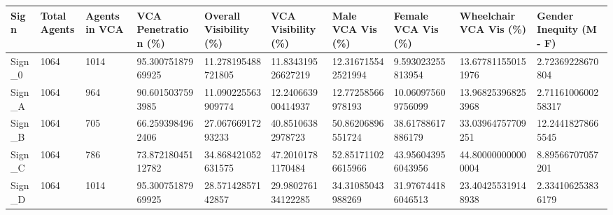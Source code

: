 \begin{tabular}{llllllllll}
\hline
Sign & Total Agents & Agents in VCA & VCA Penetration (\%) & Overall Visibility (\%) & VCA Visibility (\%) & Male VCA Vis (\%) & Female VCA Vis (\%) & Wheelchair VCA Vis (\%) & Gender Inequity (M - F) \\ \hline
Sign\_0 & 1064 & 1014 & 95.30075187969925 & 11.278195488721805 & 11.834319526627219 & 12.316715542521994 & 9.593023255813954 & 13.677811550151976 & 2.72369228670804 \\
Sign\_A & 1064 & 964 & 90.6015037593985 & 11.090225563909774 & 12.240663900414937 & 12.77258566978193 & 10.060975609756099 & 13.968253968253968 & 2.7116100600258317 \\
Sign\_B & 1064 & 705 & 66.2593984962406 & 27.06766917293233 & 40.85106382978723 & 50.86206896551724 & 38.61788617886179 & 33.03964757709251 & 12.24418278665545 \\
Sign\_C & 1064 & 786 & 73.87218045112782 & 34.868421052631575 & 47.20101781170484 & 52.851711026615966 & 43.956043956043956 & 44.800000000000004 & 8.89566707057201 \\
Sign\_D & 1064 & 1014 & 95.30075187969925 & 28.57142857142857 & 29.980276134122285 & 34.31085043988269 & 31.976744186046513 & 23.404255319148938 & 2.334106253836179 \\
\hline
\end{tabular}
